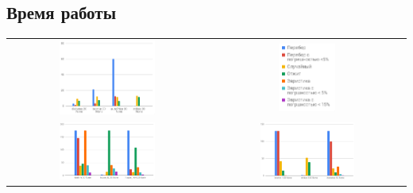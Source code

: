 \documentclass[pscyr,specification,annotation]{itmo-student-thesis}
\begin{document}
\subsection{Время работы}
    \begin{center}
    \begin{tabular}{c c}
        \includegraphics[width=0.5\textwidth]{time_easy.png} &
        \includegraphics[width=0.3\textwidth]{time_legend.png} \\
        \includegraphics[width=0.5\textwidth]{time_big.png} &
        \includegraphics[width=0.5\textwidth]{time_trees.png} \\
    \end{tabular}
    \end{center}
\end{document}
